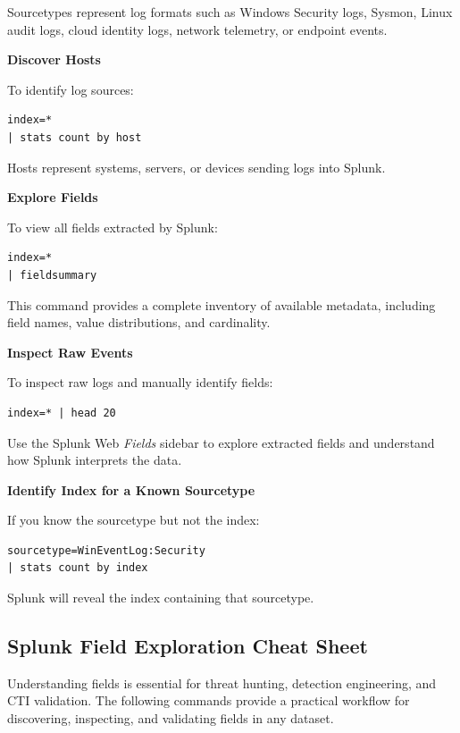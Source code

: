 Sourcetypes represent log formats such as Windows Security logs, Sysmon, Linux audit logs, cloud identity logs, 
network telemetry, or endpoint events.

\textbf{Discover Hosts}

To identify log sources:

\begin{lstlisting}
index=* 
| stats count by host
\end{lstlisting}

Hosts represent systems, servers, or devices sending logs into Splunk.

\textbf{Explore Fields}

To view all fields extracted by Splunk:

\begin{lstlisting}
index=* 
| fieldsummary
\end{lstlisting}

This command provides a complete inventory of available metadata, including field names, value distributions, 
and cardinality.

\textbf{Inspect Raw Events}

To inspect raw logs and manually identify fields:

\begin{lstlisting}
index=* | head 20
\end{lstlisting}

Use the Splunk Web \textit{Fields} sidebar to explore extracted fields and understand how Splunk interprets the data.

\textbf{Identify Index for a Known Sourcetype}

If you know the sourcetype but not the index:

\begin{lstlisting}
sourcetype=WinEventLog:Security
| stats count by index
\end{lstlisting}

Splunk will reveal the index containing that sourcetype.


\subsection*{Splunk Field Exploration Cheat Sheet}

Understanding fields is essential for threat hunting, detection engineering, and CTI validation. 
The following commands provide a practical workflow for discovering, inspecting, and validating fields 
in any dataset.

